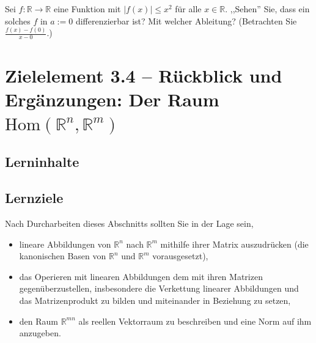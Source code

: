 \documentclass[a4paper,12pt]{article}
\begin{document}
Sei $f : \mathbb{R} \to \mathbb{R}$ eine Funktion mit $|f(x)| \leq x^2$ f\"ur
alle $x \in \mathbb{R}$. ,,Sehen'' Sie, dass ein solches $f$ in $a := 0$
differenzierbar ist? Mit welcher Ableitung? (Betrachten Sie
$\tfrac{f(x) - f(0)}{x - 0}$.)

\newpage

\section*{Zielelement 3.4 -- R\"uckblick und Erg\"anzungen: Der Raum $\mathrm{Hom}(\mathbb{R}^n, \mathbb{R}^m)$}

\subsection*{Lerninhalte}

\begin{center}
\end{center}

\subsection*{Lernziele}

Nach Durcharbeiten dieses Abschnitts sollten Sie in der Lage sein,
\begin{itemize}
  \item lineare Abbildungen von $\mathbb{R}^n$ nach $\mathbb{R}^m$ mithilfe
        ihrer Matrix auszudr\"ucken (die kanonischen Basen von $\mathbb{R}^n$
        und $\mathbb{R}^m$ vorausgesetzt),
  \item das Operieren mit linearen Abbildungen dem mit ihren Matrizen
        gegen\"uberzustellen, insbesondere die Verkettung linearer Abbildungen
        und das Matrizenprodukt zu bilden und miteinander in Beziehung zu
        setzen,
  \item den Raum $\mathbb{R}^{mn}$ als reellen Vektorraum zu beschreiben und
        eine Norm auf ihm anzugeben.
\end{itemize}
\end{document}
